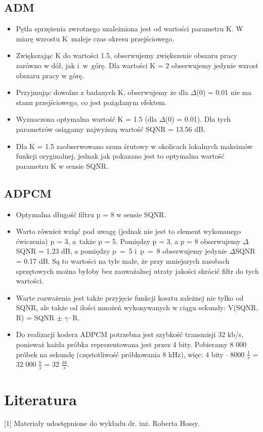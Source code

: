 \documentclass[12pt, a4paper, oneside]{article}
\begin{document}
\subsection{ADM}
\begin{itemize}
\item Pętla sprzężenia zwrotnego uzależniona jest od wartości parametru K. W miarę wzrostu K~maleje czas okresu przejściowego.
\item Zwiększając K do wartości 1.5, obserwujemy zwiększenie obszaru pracy zarówno w dół, jak i~w~górę. Dla wartości K = 2 obserwujemy jedynie wzrost obszaru pracy w górę.
\item Przyjmując dowolne z badanych K, obserwujemy że dla $\Delta$(0) = 0.01 nie ma stanu przejściowego, co jest pożądanym efektem.
\item Wyznaczona optymalna wartość K = 1.5 (dla $\Delta$(0) = 0.01). Dla tych parametrów osiągamy najwyższą wartość SQNR = 13.56 dB.
\item Dla K = 1.5 zaobserwowano szum śrutowy w okolicach lokalnych maksimów funkcji oryginalnej, jednak jak pokazano jest to optymalna wartość parametru K w sensie SQNR.
\end{itemize}
\subsection{ADPCM}
\begin{itemize}
\item Optymalna długość filtru p = 8 w sensie SQNR.
\item Warto również wziąć pod uwagę (jednak nie jest to element wykonanego ćwiczenia) p = 3, a~także p = 5. Pomiędzy p = 3, a p = 8 obserwujemy $\Delta$SQNR = 1.23 dB, a pomiędzy p~=~5 i~p~=~8 obserwujemy jedynie $\Delta$SQNR = 0.17 dB. Są to wartości na tyle małe, że przy mniejszych zasobach sprzętowych można byłoby bez zauważalnej utraty jakości skrócić filtr do tych wartości.
\item Warte rozważenia jest także przyjęcie funkcji kosztu zależnej nie tylko od SQNR, ale także od ilości mnożeń wykonywanych w ciągu sekundy: V(SQNR, R) = SQNR $\pm$ $\gamma\cdot$R.
\item Do realizacji kodera ADPCM potrzebna jest szybkość transmisji 32 kb/s, ponieważ każda próbka reprezentowana jest przez 4 bity. Pobieramy 8 000 próbek na sekundę (częstotliwość próbkowania 8 kHz), więc: 4 bity $\cdot$ 8000 $\frac{1}{s}$ = 32 000 $\frac{b}{s}$ = 32 $\frac{kb}{s}$.
\end{itemize}
\clearpage
\section{Literatura}
[1] Materiały udostępnione do wykładu dr. inż. Roberta Hossy.
\end{document}
